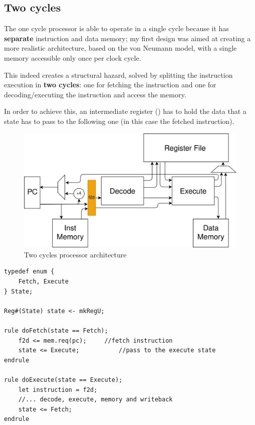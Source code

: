 \documentclass[12pt,oneside,a4paper]{article}
\begin{document}
\subsection{Two cycles}
The one cycle processor is able to operate in a single cycle because it has \textbf{separate} instruction and data memory; my first design was aimed at creating a more realistic architecture, based on the von Neumann model, with a single memory accessible only once per clock cycle.

This indeed creates a structural hazard, solved by splitting the instruction execution in \textbf{two cycles}: one for fetching the instruction and one for decoding/executing the instruction and access the memory.

In order to achieve this, an intermediate register ({\selectfont{f2d}}) has to hold the data that a state has to pass to the following one (in this case the fetched instruction).

\begin{figure}[h]
	\centering
	\includegraphics[scale=0.8]{twocycle.png}
	\caption{Two cycles processor architecture}
	\label{twocycle}
\end{figure}

\begin{lstlisting}[label={twocyclecode},caption={Two cycles processor simplified code}]
typedef enum {
	Fetch, Execute
} State;

Reg#(State) state <- mkRegU;

rule doFetch(state == Fetch);      
	f2d <= mem.req(pc);		//fetch instruction
	state <= Execute;			//pass to the execute state
endrule

rule doExecute(state == Execute);
	let instruction = f2d;
	//... decode, execute, memory and writeback
	state <= Fetch;	
endrule
\end{lstlisting}
\end{document}
